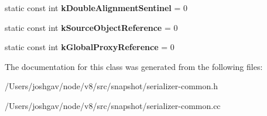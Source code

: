 \begin{DoxyCompactItemize}
\item 
static const int {\bfseries k\+Double\+Alignment\+Sentinel} = 0\hypertarget{classv8_1_1internal_1_1_serializer_deserializer_a71ed69f619892f6907c9367c41544300}{}\label{classv8_1_1internal_1_1_serializer_deserializer_a71ed69f619892f6907c9367c41544300}

\item 
static const int {\bfseries k\+Source\+Object\+Reference} = 0\hypertarget{classv8_1_1internal_1_1_serializer_deserializer_a8e9773046b50cc42107074c897f7aa6d}{}\label{classv8_1_1internal_1_1_serializer_deserializer_a8e9773046b50cc42107074c897f7aa6d}

\item 
static const int {\bfseries k\+Global\+Proxy\+Reference} = 0\hypertarget{classv8_1_1internal_1_1_serializer_deserializer_a75b385ae2b428c796260c8469e27ae15}{}\label{classv8_1_1internal_1_1_serializer_deserializer_a75b385ae2b428c796260c8469e27ae15}

\end{DoxyCompactItemize}


The documentation for this class was generated from the following files\+:\begin{DoxyCompactItemize}
\item 
/\+Users/joshgav/node/v8/src/snapshot/serializer-\/common.\+h\item 
/\+Users/joshgav/node/v8/src/snapshot/serializer-\/common.\+cc\end{DoxyCompactItemize}
